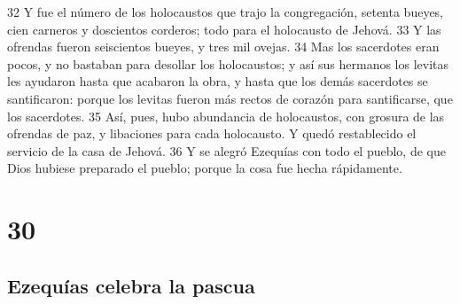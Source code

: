 32 Y fue el número de los holocaustos que trajo la congregación, setenta bueyes, cien carneros y doscientos corderos; todo para el holocausto de Jehová.
33 Y las ofrendas fueron seiscientos bueyes, y tres mil ovejas.
34 Mas los sacerdotes eran pocos, y no bastaban para desollar los holocaustos; y así sus hermanos los levitas les ayudaron hasta que acabaron la obra, y hasta que los demás sacerdotes se santificaron: porque los levitas fueron más rectos de corazón para santificarse, que los sacerdotes.
35 Así, pues, hubo abundancia de holocaustos, con grosura de las ofrendas de paz, y libaciones para cada holocausto. Y quedó restablecido el servicio de la casa de Jehová.
36 Y se alegró Ezequías con todo el pueblo, de que Dios hubiese preparado el pueblo; porque la cosa fue hecha rápidamente.

\chapter{30}

\section*{Ezequías celebra la pascua}

